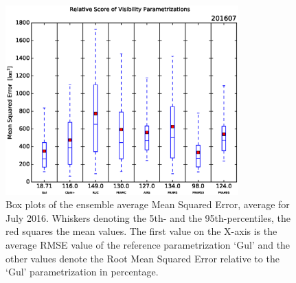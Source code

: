         \begin{figure}[p]
            \centering
            \includegraphics[width=0.8\textwidth]{graphics/results/EnsAv_RMSE_box-201607.eps}
            \caption[Box Plots of MSE, July 2016]{Box plots of the ensemble average Mean Squared Error, average for July 2016. Whiskers denoting the 5th- and the 95th-percentiles, the red squares the mean values. The first value on the X-axis is the average RMSE value of the reference parametrization `Gul' and the other values denote the Root Mean Squared Error relative to the `Gul' parametrization in percentage. }
            \label{fig:July_RMSE}
        \end{figure}

